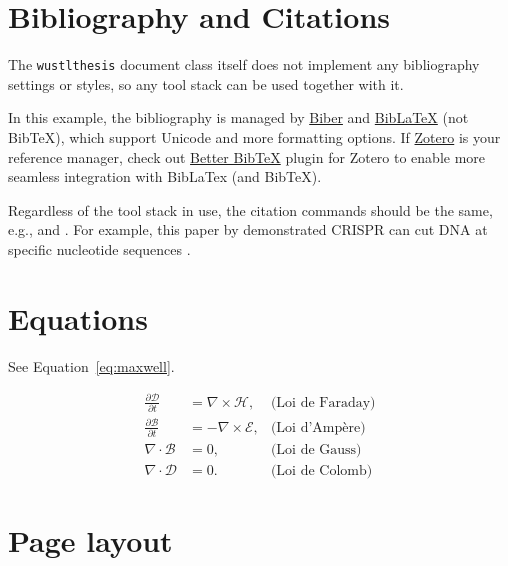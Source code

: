 \section{Bibliography and Citations}
The \texttt{wustlthesis} document class itself does not implement any bibliography settings or styles, so any tool stack can be used together with it.

In this example, the bibliography is managed by \href{http://biblatex-biber.sourceforge.net/}{Biber} and \href{https://www.ctan.org/pkg/biblatex}{BibLaTeX} (not BibTeX), which support Unicode and more formatting options.
If \href{https://www.zotero.org/}{Zotero} is your reference manager, check out \href{https://retorque.re/zotero-better-bibtex/}{Better BibTeX} plugin for Zotero to enable more seamless integration with BibLaTex (and BibTeX).

Regardless of the tool stack in use, the citation commands should be the same, e.g., \cmd{\cite} and \cmd{\citeauthor}.
For example, this paper by \citeauthor{Jinek2012} demonstrated CRISPR can cut DNA at specific nucleotide sequences \cite{Jinek2012}.


\section{Equations}
See Equation~\ref{eq:maxwell}.

\begin{equation}
    \label{eq:maxwell}
    \begin{aligned}
    \frac{\partial\mathcal{D}}{\partial t} & = \nabla\times\mathcal{H},   & \text{(Loi de Faraday)}\\
    \frac{\partial\mathcal{B}}{\partial t} & = -\nabla\times\mathcal{E},  & \text{(Loi d'Ampère)}\\
    \nabla\cdot\mathcal{B}                 & = 0,                         & \text{(Loi de Gauss)}\\
    \nabla\cdot\mathcal{D}                 & = 0.                         & \text{(Loi de Colomb)}
    \end{aligned}
\end{equation}

\clearpage
\section{Page layout}
\layout
